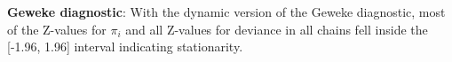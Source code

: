 \documentclass[12pt]{article}
\begin{document}


    

\textbf{Geweke diagnostic}: With the dynamic version of the Geweke diagnostic, most of the Z-values for $\pi_i$ and all Z-values for deviance in all chains fell inside the [-1.96, 1.96] interval indicating stationarity. 


    
\end{document}
